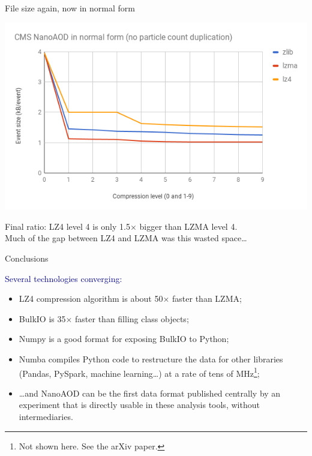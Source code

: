\documentclass{beamer}
\begin{document}
\begin{frame}{File size again, now in normal form}
\begin{center}
\includegraphics[width=\linewidth]{final-size.png}
\end{center}

Final ratio: LZ4 level 4 is only 1.5$\times$ bigger than LZMA level 4. \\
Much of the gap between LZ4 and LZMA was this wasted space\ldots
\end{frame}

\begin{frame}{Conclusions}
\vspace{0.5 cm}

\textcolor{darkblue}{Several technologies converging:}
\begin{itemize}\setlength{\itemsep}{0.25 cm}
\item LZ4 compression algorithm is about 50$\times$ faster than LZMA;
\item BulkIO is 35$\times$ faster than filling class objects;
\item Numpy is a good format for exposing BulkIO to Python;
\item Numba compiles Python code to restructure the data for other libraries (Pandas, PySpark, machine learning\ldots) at a rate of tens of MHz\footnote{Not shown here. See the arXiv paper.};
\end{itemize}

\vspace{0.25 cm}
\begin{itemize}
\item<2-> \ldots and NanoAOD can be the first data format published centrally by an experiment that is directly usable in these analysis tools, without intermediaries.
\end{itemize}
\end{frame}
\end{document}
